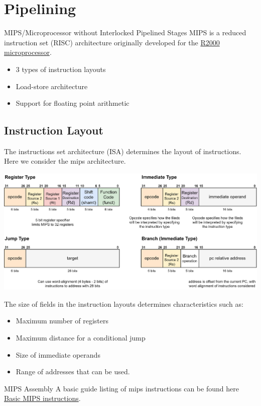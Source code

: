 \chapter{Pipelining}
\begin{definitionbox}{MIPS/Microprocessor without Interlocked Pipelined Stages}
    MIPS is a reduced instruction set (RISC) architecture originally developed for the \href{https://en.wikipedia.org/wiki/R2000_microprocessor}{R2000 microprocessor}.
    \begin{itemize}
        \item 3 types of instruction layouts
        \item Load-store architecture
        \item Support for floating point arithmetic
    \end{itemize}
\end{definitionbox}

\section{Instruction Layout}
The instructions set architecture (ISA) determines the layout of instructions. Here we consider the mips architecture.
\begin{center}
    \includegraphics[width=.9\textwidth]{pipelining/images/MIPS_instruction_set.drawio.png}
\end{center}
The size of fields in the instruction layouts determines characteristics such as:
\begin{itemize}
    \item Maximum number of registers
    \item Maximum distance for a conditional jump
    \item Size of immediate operands
    \item Range of addresses that can be used.
\end{itemize}
\begin{sidenotebox}{MIPS Assembly}
    A basic guide listing of mips instructions can be found here \href{https://www.dsi.unive.it/~gasparetto/materials/MIPS_Instruction_Set.pdf}{Basic MIPS instructions}.
\end{sidenotebox}

